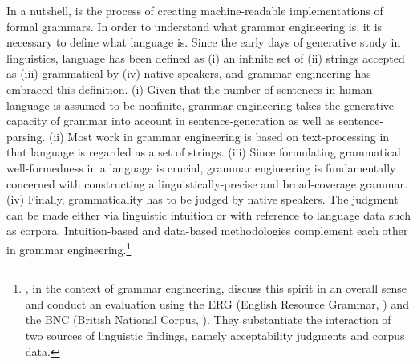 In a nutshell,  is the process of creating
machine-readable implementations of formal grammars. In order to
understand what grammar engineering is, it is necessary to define what
language is.  Since the early days of generative study in linguistics,
language has been defined as (i) an infinite set of (ii) strings
accepted as (iii) grammatical by (iv) native speakers, and grammar
engineering has embraced this definition.  (i) Given that the number
of sentences in human language is assumed to be nonfinite, grammar
engineering takes the generative capacity of grammar into account in
sentence-generation as well as sentence-parsing. (ii) Most work in
grammar engineering is based on text-processing in that language is
regarded as a set of strings. (iii) Since formulating grammatical
well-formedness in a language is crucial, grammar engineering is
fundamentally concerned with constructing a linguistically-precise and
broad-coverage grammar. (iv) Finally, grammaticality has to be judged
by native speakers. The judgment can be made either via linguistic
intuition or with reference to language data such as corpora.
Intuition-based and data-based methodologies complement each other in
grammar engineering.\footnote{\citet{balwin:etal:05}, in the context
  of grammar engineering, discuss this spirit in an overall sense and
  conduct an evaluation using the ERG (English Resource Grammar,
  \citealt{flickinger:00}) and the BNC (British National Corpus,
  \citealt{burnard:00}). They substantiate the interaction of two
  sources of linguistic findings, namely acceptability judgments and
  corpus data.}




